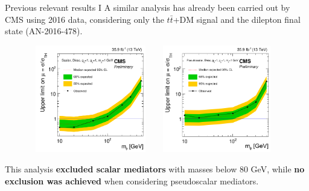 \documentclass[8pt]{beamer}
\begin{document}
\begin{frame}{Previous relevant results I}
\justifying
\vspace{5pt}
A similar analysis has already been carried out by CMS using 2016 data, considering only the $t \bar t$+DM signal and the dilepton final state (AN-2016-478). \vfill %


\begin{figure}[htbp]
\centering
\begin{minipage}[b]{.49\textwidth}
\includegraphics[width=5.4cm, height=4.7cm]{figs/Juan_S.png}
\end{minipage}\hfill
\begin{minipage}[b]{.49\textwidth}
\includegraphics[width=5.4cm, height=4.7cm]{figs/Juan_PS.png}
\end{minipage}\hfill
\label{fig:Juan}
\end{figure}

This analysis \textbf{excluded scalar mediators} with masses below 80 GeV, while \textbf{no exclusion was achieved} when considering pseudoscalar mediators. \vfill

\end{frame}
\end{document}
